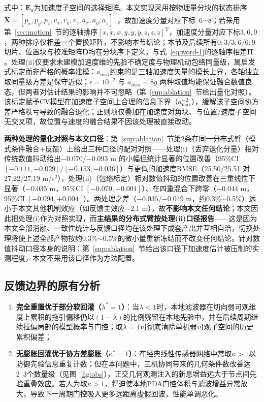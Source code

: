 \documentclass[UTF8,a4paper,zihao=-4]{ctexart}
\begin{document}
式中：\(\boldsymbol{E}_{a}\)为加速度子空间的选择矩阵。本文实现采用按物理量分块的状态排序\(\boldsymbol{X}=[p_x,p_y,p_z,v_x,v_y,v_z,a_x,a_y,a_z]^{\mathrm T}\)，故加速度分量对应下标~6$\sim$8；若采用第~\ref{sec:motion}~节的逐轴排序\([x,\dot{x},\ddot{x},y,\dot{y},\ddot{y},z,\dot{z},\ddot{z}]^{\mathrm T}\)，加速度分量对应下标\(3,6,9\)，两种排序仅相差一个置换矩阵，不影响本节结论；本节及后续所有\(0:3/3:6/6:9\)切片、位置块与校准矩阵\(\boldsymbol D\)均在分块序下定义，与式~\eqref{eq:word-1}的逐轴序相差\(\boldsymbol\Pi\)。处理(ii)仅要求未建模加速度维的先验不确定度与物理机动包络同量级，属启发式标定而非严格的概率建模：\(a_{\max}\)约束的是三轴加速度矢量的模长上界，各轴独立取同量级方差是保守近似；\(\epsilon=10^{-2}\) 与 \(a_{\max}=8g\) 两种取值均能保证融合数值良态，但两者对估计结果的影响并不可忽略（第~\ref{sup:ablation}~节给出量化对照）。该标定赋予CV模型在加速度子空间上合理的信息下界（\(a_{\max}^{-2}\)），缓解该子空间协方差严格秩亏导致的融合退化；正则项仅叠加在加速度对角块、与位置/速度子空间无交叉项，故位置与速度的融合结果不因该处理被直接改动。

\textbf{两种处理的量化对照与本文口径}：第~\ref{sup:ablation}~节第2条在同一分布式臂（模式条件融合+反馈）上给出三种口径的配对对照——处理(i)（丢弃退化分量）相对传统数值抖动给出$-0.070$/$-0.093$ m 的小幅但统计显著的位置改善（95\%CI $[-0.111,-0.029]$/$[-0.153,-0.036]$）与更低的加速度RMSE（25.50/25.51 对 27.22/27.19 m/s$^2$），处理(ii)（包络标定）相对数值抖动的位置改善在三重线性下显著（$-0.035$ m，95\%CI $[-0.070,-0.001]$）、在四重混合下跨零（$-0.044$ m，95\%CI $[-0.094,+0.004]$）。两处理之差（$-0.035$/$-0.049$ m，约0.3\%$\sim$0.5\%）远小于本文其他机制效应（如反馈主效应$-2.1$ m），故\textbf{不影响本文任何结论}；本文因此把处理(i)作为对照实现，而\textbf{主结果的分布式臂按处理(ii)口径报告}——这是因为本文全部消融、一致性统计与反馈口径均在该处理下成套产出并互相自洽，切换处理将使上述全部产物按约0.3\%$\sim$0.5\%的微小量重新冻结而不改变任何结论。针对数值抖动口径本身的说明：第~\ref{sup:ablation}~节给出该口径下加速度估计被压制的实测程度，本文不采用该口径作为方法配置。



\subsection{反馈边界的原有分析}\label{sup:feedback}
\begin{enumerate}
\item \textbf{完全重置优于部分软回灌（\(\lambda^{*}=1\)）}：当\(\lambda<1\)时，本地滤波器在切向弱可观维度上累积的拖引偏移仍以\((1-\lambda)\)的比例残留在本地先验中，并在后续周期继续拉偏局部的模型概率与门控；取\(\lambda=1\)可彻底清除单机弱可观子空间的历史累积偏差；
\item \textbf{无膨胀回灌优于协方差膨胀（\(\kappa^{*}=1\)）}：在经典线性传感器网络中常取\(\kappa>1\)以防御先验信息重复计数；但在本问题中，三机协同带来的几何条件数改善达2~3个数量级（见图~\ref{fig:obs}），正交几何观测注入的新息增益远大于节点间先验重叠效应。若人为取\(\kappa>1\)，将迫使本地PDA门控体积与滤波增益异常放大，导致下一周期门控吸入更多远距离虚假回波，性能单调恶化。
\end{enumerate}
\end{document}
